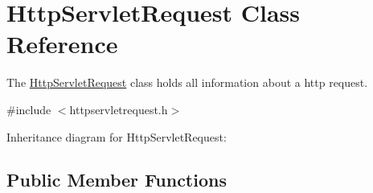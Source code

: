 \hypertarget{class_http_servlet_request}{}\section{Http\+Servlet\+Request Class Reference}
\label{class_http_servlet_request}


The \hyperlink{class_http_servlet_request}{Http\+Servlet\+Request} class holds all information about a http request.  




{\ttfamily \#include $<$httpservletrequest.\+h$>$}



Inheritance diagram for Http\+Servlet\+Request\+:
\subsection*{Public Member Functions}
